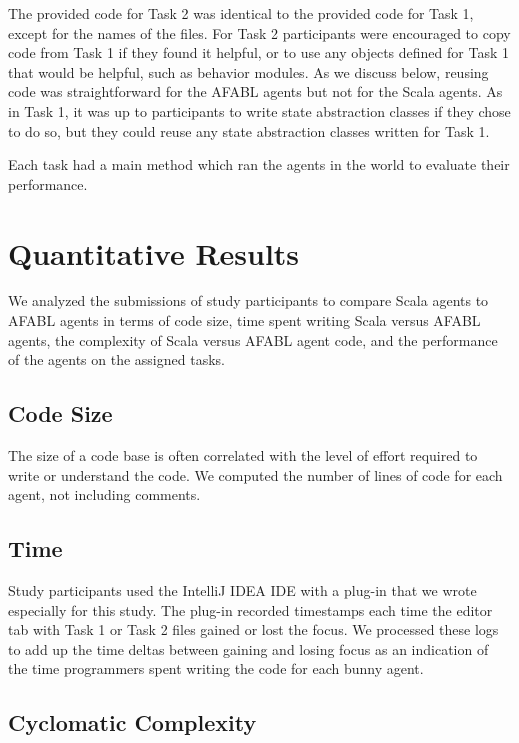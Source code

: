 The provided code for Task 2 was identical to the provided code for Task 1, except for the names of the files. For Task 2 participants were encouraged to copy code from Task 1 if they found it helpful, or to use any objects defined for Task 1 that would be helpful, such as behavior modules. As we discuss below, reusing code was straightforward for the AFABL agents but not for the Scala agents. As in Task 1, it was up to participants to write state abstraction classes if they chose to do so, but they could reuse any state abstraction classes written for Task 1.

Each task had a main method which ran the agents in the world to evaluate their performance.

\section{Quantitative Results}

We analyzed the submissions of study participants to compare Scala agents to AFABL agents in terms of code size, time spent writing Scala versus AFABL agents, the complexity of Scala versus AFABL agent code, and the performance of the agents on the assigned tasks.

\subsection{Code Size}

The size of a code base is often correlated with the level of effort required to write or understand the code. We computed the number of lines of code for each agent, not including comments.

\subsection{Time}

Study participants used the IntelliJ IDEA IDE with a plug-in that we wrote especially for this study. The plug-in recorded timestamps each time the editor tab with Task 1 or Task 2 files gained or lost the focus. We processed these logs to add up the time deltas between gaining and losing focus as an indication of the time programmers spent writing the code for each bunny agent.

\subsection{Cyclomatic Complexity}

